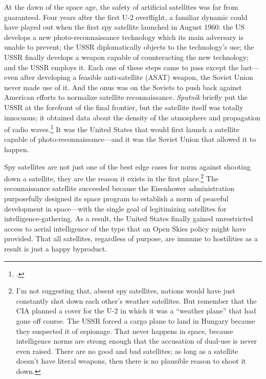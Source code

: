 \documentclass{memoir}
\begin{document}
At the dawn of the space age, the safety of artificial satellites was far from guaranteed. Four years after the first U-2 overflight, a familiar dynamic could have played out when the first spy satellite launched in August 1960: the US develops a new photo-reconnaissance technology which its main adversary is unable to prevent; the USSR diplomatically objects to the technology's use; the USSR finally develops a weapon capable of counteracting the new technology; and the USSR employs it. Each one of these steps came to pass except the last---even after developing a feasible anti-satellite (ASAT) weapon, the Soviet Union never made use of it. And the onus was on the Soviets to push back against American efforts to normalize satellite reconnaissance. \emph{Sputnik} briefly put the USSR at the forefront of the final frontier, but the satellite itself was totally innocuous; it obtained data about the density of the atmosphere and propagation of radio waves.\footcite{nasa_sputnik_2019} It was the United States that would first launch a satellite capable of photo-reconnaissance---and it was the Soviet Union that allowed it to happen.

Spy satellites are not just one of the best edge cases for norm against shooting down a satellite, they are the reason it exists in the first place.\footnote{I'm not suggesting that, absent spy satellites, nations would have just constantly shot down each other's weather satellites. But remember that the CIA planned a cover for the U-2 in which it was a ``weather plane'' that had gone off course. The USSR forced a cargo plane to land in Hungary because they suspected it of espionage. That never happens in space, because intelligence norms are strong enough that the accusation of dual-use is never even raised. There are no good and bad satellites; as long as a satellite doesn't have literal weapons, then there is no plausible reason to shoot it down.} The reconnaissance satellite succeeded because the Eisenhower administration purposefully designed its space program to establish a norm of peaceful development in space---with the single goal of legitimizing satellites for intelligence-gathering. As a result, the United States finally gained unrestricted access to aerial intelligence of the type that an Open Skies policy might have provided. That all satellites, regardless of purpose, are immune to hostilities as a result is just a happy byproduct.
\end{document}
